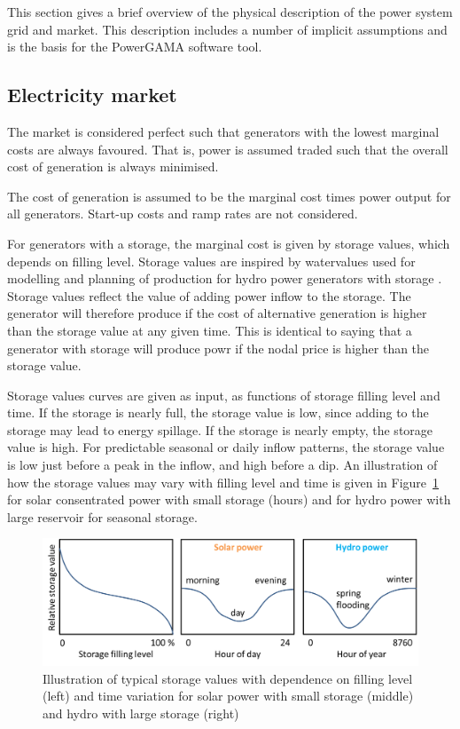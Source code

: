 \documentclass{article}
\begin{document}
This section gives a brief overview of the physical description of the power system grid and market. This description includes a number of implicit assumptions and is the basis for the PowerGAMA software tool.



\subsection{Electricity market}
The market is considered perfect such that generators with the lowest marginal costs are always favoured. That is, power is assumed traded such that the overall cost of generation is always minimised.

The cost of generation is assumed to be the marginal cost times power output for all generators. Start-up costs and ramp rates are not considered.

For generators with a storage, the marginal cost is given by storage values, which depends on filling level.
Storage values are inspired by watervalues used for modelling and planning of production for hydro power generators with storage \cite{fosso1999,wolfgang2009}. Storage values reflect the value of adding power inflow to the storage. The generator will therefore produce if the cost of alternative generation is higher than the storage value at any given time. This is identical to saying that a generator with storage will produce powr if the nodal price is higher than the storage value.

Storage values curves are given as input, as functions of storage filling level and time.
If the storage is nearly full, the storage value is low, since adding to the storage may lead to energy spillage. If the storage is nearly empty, the storage value is high. 
For predictable seasonal or daily inflow patterns, the storage value is low just before a peak in the inflow,  and high before a dip. An illustration of how the storage values may vary with filling level and time is given in Figure~\ref{fig:storagevalues} for solar consentrated power with small storage (hours) and for hydro power with large reservoir for seasonal storage.


\begin{figure}
\centering
\includegraphics[scale=0.6]{storagevalues.png}
\caption{Illustration of typical storage values with dependence on filling level (left) and time variation for solar power with small storage (middle) and hydro with large storage (right)}
\label{fig:storagevalues}
\end{figure}
\end{document}
